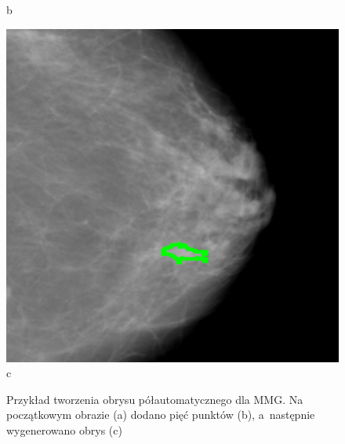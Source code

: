 \documentclass[a4paper,11pt,twoside,openright]{report}
\theoremstyle{definition}
\begin{document}
\begin{figure}[h!]
\begin{center}
\begin{center}
		b
	\end{center}
	\endminipage\hfill
	\begin{center}
		\includegraphics[width=1.0\textwidth]{172}
		c
	\end{center}
	\endminipage\hfill
	\caption{Przykład tworzenia obrysu półautomatycznego dla MMG. Na początkowym obrazie (a) dodano pięć punktów (b),
	a~następnie wygenerowano obrys (c)}
	\label{fig:170}
\end{center}
\end{figure}
\end{document}
